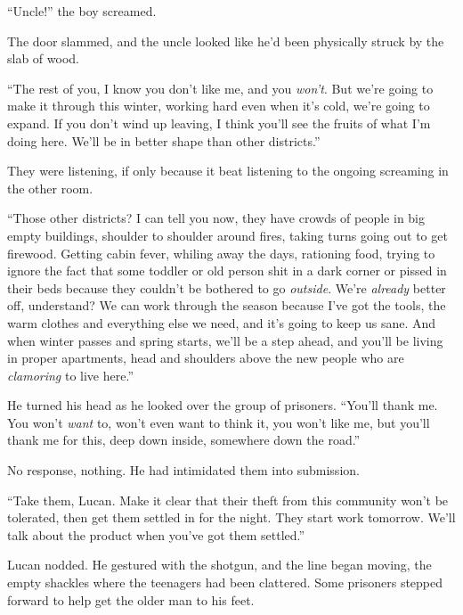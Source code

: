 ``Uncle!'' the boy screamed.



The door slammed, and the uncle looked like he'd been physically struck by the slab of wood.



``The rest of you, I know you don't like me, and you \emph{won't}.  But we're going to make it through this winter, working hard even when it's cold, we're going to expand.  If you don't wind up leaving, I think you'll see the fruits of what I'm doing here.  We'll be in better shape than other districts.''



They were listening, if only because it beat listening to the ongoing screaming in the other room.



``Those other districts?  I can tell you now, they have crowds of people in big empty buildings, shoulder to shoulder around fires, taking turns going out to get firewood.  Getting cabin fever, whiling away the days, rationing food, trying to ignore the fact that some toddler or old person shit in a dark corner or pissed in their beds because they couldn't be bothered to go \emph{outside}.  We're \emph{already} better off, understand?  We can work through the season because I've got the tools, the warm clothes and everything else we need, and it's going to keep us sane.  And when winter passes and spring starts, we'll be a step ahead, and you'll be living in proper apartments, head and shoulders above the new people who are \emph{clamoring} to live here.''



He turned his head as he looked over the group of prisoners.  ``You'll thank me.  You won't \emph{want} to, won't even want to think it, you won't like me, but you'll thank me for this, deep down inside, somewhere down the road.''



No response, nothing.  He had intimidated them into submission.



``Take them, Lucan.  Make it clear that their theft from this community won't be tolerated, then get them settled in for the night.  They start work tomorrow.  We'll talk about the product when you've got them settled.''



Lucan nodded.  He gestured with the shotgun, and the line began moving, the empty shackles where the teenagers had been clattered.  Some prisoners stepped forward to help get the older man to his feet.



